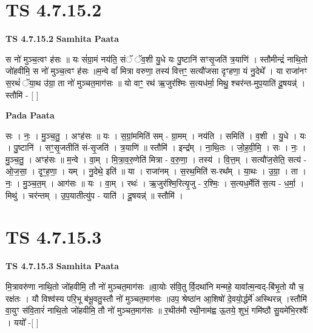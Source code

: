 \documentclass[17pt]{extarticle}
\begin{document}
\section*{ TS 4.7.15.2 }

\textbf{TS 4.7.15.2 } \newline
\textbf{Samhita Paata} \newline

स नो॑ मुञ्च॒त्वꣳ ह॑सः ॥ यः सं॑ग्रा॒मं नय॑ति॒ संॅ ॅव॒शी यु॒धे यः पु॒ष्टानि॑ सꣳसृ॒जति॑ त्र॒याणि॑ । स्तौमीन्द्रं॑ नाथि॒तो जो॑हवीमि॒ स नो॑ मुञ्च॒त्वꣳ ह॑सः ॥म॒न्वे वां᳚ मित्रा वरुणा॒ तस्य॑ वित्तꣳ॒॒ सत्यौ॑जसा दृꣳहणा॒ यं नु॒देथे᳚ । या राजा॑नꣳ स॒रथं॑ ॅया॒थ उ॑ग्रा॒ ता नो॑ मुञ्चत॒माग॑सः ॥ यो वाꣳ॒॒ रथ॑ ऋ॒जुर॑श्मिः स॒त्यध॑र्मा॒ मिथु॒ श्चर॑न्त-मुप॒याति॑ दू॒षयन्न्॑ । स्तौमि॑ - [  ] \newline

\textbf{Pada Paata} \newline

सः । नः॒ । मु॒ञ्च॒तु॒ । अꣳह॑सः ॥ यः । स॒ग्रां॒ममिति॑ सम् - ग्रा॒मम् । नय॑ति । समिति॑ । व॒शी । यु॒धे । यः । पु॒ष्टानि॑ । सꣳ॒॒सृ॒जतीति॑ सं-सृ॒जति॑ । त्र॒याणि॑ ॥ स्तौमि॑ । इन्द्र᳚म् । ना॒थि॒तः । जो॒ह॒वी॒मि॒ । सः । नः॒ । मु॒ञ्च॒तु॒ । अꣳह॑सः ॥ म॒न्वे । वा॒म् । मि॒त्रा॒व॒रु॒णेति॑ मित्रा - व॒रु॒णा॒ । तस्य॑ । वि॒त्त॒म् । सत्यौ॑ज॒सेति॒ सत्य॑ - ओ॒ज॒सा॒ । दृꣳ॒॒ह॒णा॒ । यम् । नु॒देथे॒ इति॑ ॥ या । राजा॑नम् । स॒रथ॒मिति॑ स-रथ᳚म् । या॒थः । उ॒ग्रा॒ । ता । नः॒ । मु॒ञ्च॒त॒म् । आग॑सः ॥ यः । वा॒म् । रथः॑ । ऋ॒जुर॑श्मि॒रित्यृ॒जु - र॒श्मिः॒ । स॒त्यध॒र्मेति॑ स॒त्य - ध॒र्मा॒ । मिथु॑ । चर॑न्तम् । उ॒प॒यातीत्यु॑प - याति॑ । दू॒षयन्न्॑ ॥ स्तौमि॑ ।  \newline




\section*{ TS 4.7.15.3 }

\textbf{TS 4.7.15.3 } \newline
\textbf{Samhita Paata} \newline

मि॒त्रावरु॑णा नाथि॒तो जो॑हवीमि॒ तौ नो॑ मुञ्चत॒माग॑सः ॥वा॒योः स॑वि॒तु र्वि॒दथा॑नि मन्महे॒ यावा᳚त्म॒न्वद्-बि॑भृ॒तो यौ च॒ रक्ष॑तः । यौ विश्व॑स्य परि॒भू ब॑भू॒वतु॒स्तौ नो॑ मुञ्चत॒माग॑सः ॥उप॒ श्रेष्ठा॑न आ॒शिषो॑ दे॒वयो॒र्द्धर्मे॑ अस्थिरन्न् ।स्तौमि॑ वा॒युꣳ स॑वि॒तारं॑ नाथि॒तो जो॑हवीमि॒ तौ नो॑ मुञ्चत॒माग॑सः ॥ र॒थीत॑मौ रथी॒नाम॑ह्व ऊ॒तये॒ शुभं॒ गमि॑ष्ठौ सु॒यमे॑भि॒रश्वैः᳚ । ययो᳚ -[  ] \newline
\end{document}
